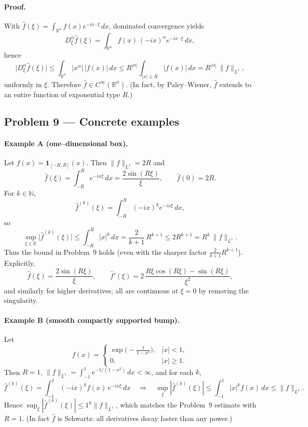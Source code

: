 \documentclass[12pt,a4paper]{article}
\theoremstyle{plain}
\theoremstyle{definition}
\theoremstyle{remark}
\theoremstyle{remark}
\begin{document}
\paragraph{Proof.}
With $\widehat f(\xi)=\int_{\mathbb R^n} f(x)e^{-i x\cdot\xi}\,dx$, dominated convergence yields
\[
D_\xi^\alpha \widehat f(\xi)
=\int_{\mathbb R^n} f(x)\,(-i x)^\alpha e^{-i x\cdot\xi}\,dx,
\]
hence
\[
\big|D_\xi^\alpha \widehat f(\xi)\big|
\le \int_{\mathbb R^n} |x^\alpha|\,|f(x)|\,dx
\le R^{|\alpha|}\int_{|x|\le R} |f(x)|\,dx
= R^{|\alpha|}\,\|f\|_{L^1},
\]
uniformly in $\xi$. Therefore $\widehat f\in C^\infty(\mathbb R^n)$. (In fact, by Paley--Wiener, $\widehat f$ extends to an entire function of exponential type $R$.)

\bigskip

\subsection*{Problem 9 — Concrete examples}

\paragraph{Example A (one–dimensional box).}
Let $f(x)=\mathbf 1_{[-R,R]}(x)$. Then $\|f\|_{L^1}=2R$ and
\[
\widehat f(\xi)=\int_{-R}^{R} e^{-ix\xi}\,dx
=\frac{2\sin(R\xi)}{\xi}, \qquad \widehat f(0)=2R .
\]
For $k\in\mathbb N$,
\[
\widehat f^{(k)}(\xi)=\int_{-R}^{R} (-ix)^k e^{-ix\xi}\,dx,
\]
so
\[
\sup_{\xi\in\mathbb R}\big|\widehat f^{(k)}(\xi)\big|
\le \int_{-R}^{R} |x|^k\,dx
=\frac{2}{k+1}\,R^{k+1}
\le 2R^{k+1}
= R^{k}\,\|f\|_{L^1}.
\]
Thus the bound in Problem~9 holds (even with the sharper factor $\tfrac{2}{k+1}R^{k+1}$).
Explicitly,
\[
\widehat f(\xi)=\frac{2\sin(R\xi)}{\xi},\qquad
\widehat f'(\xi)=2\,\frac{R\xi\cos(R\xi)-\sin(R\xi)}{\xi^2},
\]
and similarly for higher derivatives; all are continuous at $\xi=0$ by removing the singularity.

\bigskip

\paragraph{Example B (smooth compactly supported bump).}
Let
\[
f(x)=
\begin{cases}
	\exp\!\big(-\frac{1}{1-x^2}\big), & |x|<1,\\[2pt]
	0, & |x|\ge 1.
\end{cases}
\]
Then $R=1$, $\|f\|_{L^1}=\int_{-1}^{1} e^{-1/(1-x^2)}\,dx<\infty$, and for each $k$,
\[
\widehat f^{(k)}(\xi)=\int_{-1}^{1} (-ix)^k f(x)\,e^{-ix\xi}\,dx
\quad\Rightarrow\quad
\sup_{\xi} |\widehat f^{(k)}(\xi)|
\le \int_{-1}^{1} |x|^{k} f(x)\,dx
\le \|f\|_{L^1}.
\]
Hence $\sup_{\xi} |\widehat f^{(k)}(\xi)| \le 1^{k}\|f\|_{L^1}$, which matches the Problem~9 estimate with $R=1$.
(In fact $\widehat f$ is Schwartz: all derivatives decay faster than any power.)
\end{document}
